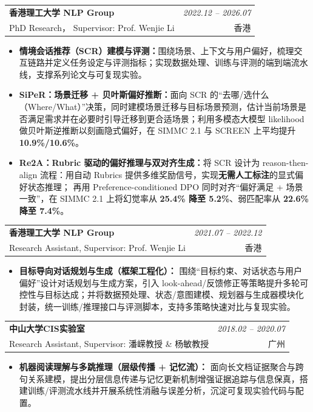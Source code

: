 \documentclass[11pt,a4paper,fontset=fandol]{ctexart}
\makeatletter
\newcommand{\Entry}[4]{%
\begin{tabularx}{\linewidth}{@{}Xr@{}}
\textbf{#1} & \textit{#2}\\
{\small #3} & {\small #4}
\end{tabularx}\vspace{0.16em}
}
\makeatother
\begin{document}
\Entry{香港理工大学 NLP Group}{2022.12 -- 2026.07}{PhD Research， Supervisor: Prof. Wenjie Li}{香港}
\begin{itemize}
    \item \textbf{情境会话推荐（SCR）建模与评测：}围绕场景、上下文与用户偏好，梳理交互链路并定义任务设定与评测指标；实现数据处理、训练与评测的端到端流水线，支撑系列论文与可复现实验。
    \item \textbf{SiPeR：场景迁移 + 贝叶斯偏好推断：}面向 SCR 的“去哪/选什么（Where/What）”决策，同时建模场景迁移与目标场景预测，估计当前场景是否满足需求并在必要时引导迁移到更合适场景；利用多模态大模型 likelihood 做贝叶斯逆推断以刻画隐式偏好，在 SIMMC 2.1 与 SCREEN 上平均提升 \textbf{10.9\%/10.6\%}。
    \item \textbf{Re2A：Rubric 驱动的偏好推理与双对齐生成：}将 SCR 设计为 reason-then-align 流程：用自动 Rubrics 提供多维奖励信号，实现\textbf{无需人工标注}的显式偏好状态推理；
    再用 Preference-conditioned DPO 同时对齐“偏好满足 + 场景一致”，在 SIMMC 2.1 上将幻觉率从 \textbf{25.4\% 降至 5.2\%}、弱匹配率从 \textbf{22.6\% 降至 7.4\%}。
\end{itemize}

\Entry{香港理工大学 NLP Group}{2021.07 -- 2022.12}{Research Assistant, Supervisor: Prof. Wenjie Li}{香港}
\begin{itemize}
    \item \textbf{目标导向对话规划与生成（框架工程化）：}
    围绕“目标约束、对话状态与用户偏好”设计对话规划与生成方案，引入 look-ahead/反馈修正等策略提升多轮可控性与目标达成；并将数据预处理、状态/意图建模、规划器与生成器模块化封装，统一训练/推理接口与评测脚本，支持多策略快速对比与复现实验。
\end{itemize}

\Entry{中山大学CIS实验室}{2018.02 -- 2020.07}{Research Assistant, Supervisor: 潘嵘教授 \& 杨敏教授}{广州}
\begin{itemize}
    \item \textbf{机器阅读理解与多跳推理（层级传播 + 记忆流）：}
    面向长文档证据聚合与跨句关系建模，提出分层信息传递与记忆更新机制增强证据追踪与信息保真，搭建训练/评测流水线并开展系统性消融与误差分析，沉淀可复现实验代码与配置。
\end{itemize}
\end{document}

